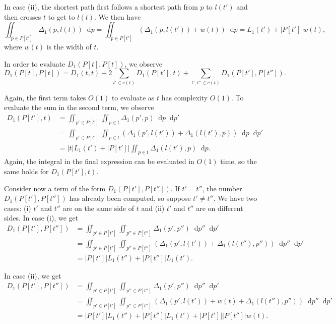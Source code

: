 \documentclass{article}
\newcommand*\diff{\mathop{}\!\mathrm{d}}
\begin{document}
In case (ii), the shortest path first follows a shortest path from $p$ to $l(t')$ and then crosses $t$ to get to $l(t)$.
We then have
\[
\iint_{p \in P[t']} \Delta_1(p,l(t)) \diff p =
\iint_{p \in P[t']} (\Delta_1(p,l(t')) + w(t)) \diff p =
L_1(t') + \left\vert P[t']\right\vert w(t),
\]
where $w(t)$ is the width of $t$.

In order to evaluate $D_1(P[t],P[t])$, we observe
\[
D_1(P[t],P[t]) =
D_1(t,t) +
2\sum_{t'\in c(t)} D_1(P[t'],t) +
\sum_{t',t''\in c(t)} D_1(P[t'],P[t'']).
\]

Again, the first term takes $O(1)$ to evaluate as $t$ has complexity $O(1)$.
To evaluate the sum in the second term, we observe
\begin{align*}
D_1(P[t'],t) & =
\iint_{p' \in P[t']} \iint_{p \in t} \Delta_1(p',p) \diff p\diff p' \\
& = \iint_{p' \in P[t']} \iint_{p \in t} (\Delta_1(p',l(t')) + \Delta_1(l(t'),p)) \diff p\diff p' \\
& = \left\vert t\right\vert L_1(t') + \left\vert P[t']\right\vert \iint_{p\in t} \Delta_1(l(t'),p)\diff p.
\end{align*}
Again, the integral in the final expression can be evaluated in $O(1)$ time, so the same holds for $D_1(P[t'],t)$.

Consider now a term of the form $D_1(P[t'],P[t''])$.
If $t'=t''$, the number $D_1(P[t'],P[t''])$ has already been computed, so suppose $t'\neq t''$.
We have two cases:
(i) $t'$ and $t''$ are on the same side of $t$ and (ii) $t'$ and $t''$ are on different sides.
In case (i), we get
\begin{align*}
D_1(P[t'],P[t'']) & =
\iint_{p' \in P[t']}
\iint_{p'' \in P[t'']} \Delta_1(p',p'') \diff p''\diff p' \\
& = \iint_{p' \in P[t']}
\iint_{p'' \in P[t'']} (\Delta_1(p',l(t')) + \Delta_1(l(t''),p'')) \diff p''\diff p' \\
& = \left\vert P[t']\right \vert L_1(t'') + \left \vert P[t'']\right \vert L_1(t').
\end{align*}

In case (ii), we get
\begin{align*}
D_1(P[t'],P[t'']) & = \iint_{p' \in P[t']}
\iint_{p'' \in P[t'']} \Delta_1(p',p'') \diff p''\diff p' \\
& = \iint_{p' \in P[t']}
\iint_{p'' \in P[t'']} (\Delta_1(p',l(t')) + w(t) + \Delta_1(l(t''),p'')) \diff p''\diff p' \\
& = \left\vert P[t']\right\vert  L_1(t'') + \left \vert P[t'']\right\vert L_1(t') + \left\vert P[t']\right\vert \left\vert P[t'']\right\vert w(t).
\end{align*}
\end{document}
